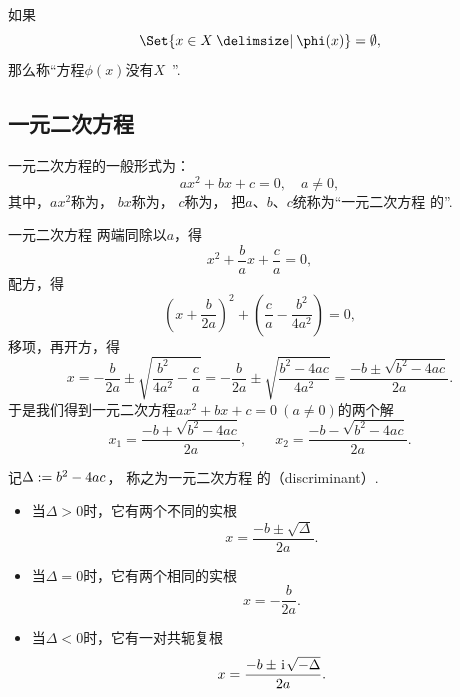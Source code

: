 如果\begin{equation*}
	\Set{ x \in X \given \phi(x) } = \emptyset,
\end{equation*}
那么称“方程\(\phi(x)\)没有\(X\)~”.

\subsection{一元二次方程}
一元二次方程的一般形式为：
\begin{equation}\label{equation:一元二次方程.一元二次方程的一般形式}
	ax^2 + bx + c = 0, \quad a \neq 0,
\end{equation}
其中，\(ax^2\)称为，
\(bx\)称为，
\(c\)称为，
把\(a\)、\(b\)、\(c\)统称为“一元二次方程  的”.

一元二次方程  两端同除以\(a\)，得\begin{equation*}
	x^2 + \frac{b}{a} x + \frac{c}{a} = 0,
\end{equation*}
配方，得\begin{equation*}
	\left( x + \frac{b}{2a} \right)^2 + \left( \frac{c}{a} - \frac{b^2}{4a^2} \right) = 0,
\end{equation*}
移项，再开方，得\begin{equation*}
	x = -\frac{b}{2a} \pm \sqrt{\frac{b^2}{4a^2} - \frac{c}{a}}
	= -\frac{b}{2a} \pm \sqrt{\frac{b^2-4ac}{4a^2}}
	= \frac{-b \pm \sqrt{b^2-4ac}}{2a}.
\end{equation*}
于是我们得到一元二次方程\(ax^2 + bx + c = 0\ (a\neq0)\)的两个解\begin{equation*}
	x_1 = \frac{-b + \sqrt{b^2-4ac}}{2a},
	\qquad
	x_2 = \frac{-b - \sqrt{b^2-4ac}}{2a}.
\end{equation*}

\begin{theorem}
记\(\Delta := b^2-4ac\)，
称之为一元二次方程 
的（{\rm discriminant}）.
\begin{itemize}
	\item 当\(\Delta > 0\)时，它有两个不同的实根\begin{equation*}
		x = \frac{-b \pm \sqrt{\Delta}}{2a}.
	\end{equation*}
	\item 当\(\Delta = 0\)时，它有两个相同的实根\begin{equation*}
		x = -\frac{b}{2a}.
	\end{equation*}
	\item 当\(\Delta < 0\)时，它有一对共轭复根\begin{equation*}
		x = \frac{-b \pm \kern1pt\mathrm{i}\kern1pt \sqrt{-\Delta}}{2a}.
	\end{equation*}
\end{itemize}
\end{theorem}


